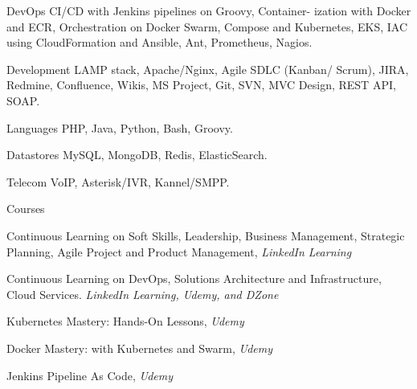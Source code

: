 
\begin{cvdesc}

  \cvdesch
    {DevOps} %
    {CI/CD with Jenkins pipelines on Groovy, Container- ization with Docker and ECR, Orchestration on Docker Swarm, Compose and Kubernetes, EKS, IAC using CloudFormation and Ansible, Ant, Prometheus, Nagios.} %

  \cvdesch
    {Development} %
    {LAMP stack, Apache/Nginx, Agile SDLC (Kanban/ Scrum), JIRA, Redmine, Confluence, Wikis, MS Project, Git, SVN, MVC Design, REST API, SOAP.} %

  \cvdesch
    {Languages} %
    {PHP, Java, Python, Bash, Groovy.} %

  \cvdesch
    {Datastores} %
    {MySQL, MongoDB, Redis, ElasticSearch.} %

  \cvdesch
    {Telecom} %
    {VoIP, Asterisk/IVR, Kannel/SMPP.} %

\end{cvdesc}

\begin{cvdesc}
  \cvdescv
    {Courses}
    {
      \begin{cvitems}
      \item {Continuous Learning on Soft Skills, Leadership, Business Management, Strategic Planning, Agile Project and Product Management, \textit{LinkedIn Learning}}
      \item {Continuous Learning on DevOps, Solutions Architecture and Infrastructure, Cloud Services. \textit{LinkedIn Learning, Udemy, and DZone}}
      \item {Kubernetes Mastery: Hands-On Lessons, \textit{Udemy}}
      \item {Docker Mastery: with Kubernetes and Swarm, \textit{Udemy}}
      \item {Jenkins Pipeline As Code, \textit{Udemy}}
      \end{cvitems}
    }

\end{cvdesc}
